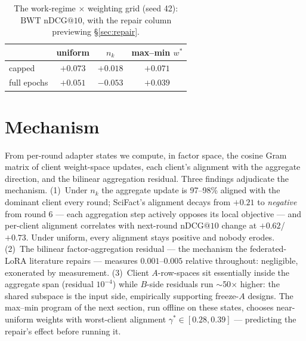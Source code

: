 \documentclass[sigconf,anonymous,review]{acmart}
\makeatletter
\newcommand{\ndcg}{\mathrm{nDCG@10}}
\newcommand{\BWT}{\mathrm{BWT}}
\makeatother
\begin{document}
\begin{table}[t]
\caption{The work-regime $\times$ weighting grid (seed 42): $\BWT$ $\ndcg$, with the repair column previewing \S\ref{sec:repair}.}
\label{tab:grid}
\begin{tabular}{lccc}
\toprule
 & uniform & $n_k$ & max--min $w^\ast$\\
\midrule
capped & $+0.073$ & $+0.018$ & $+0.071$\\
full epochs & $+0.051$ & $\mathbf{-0.053}$ & $+0.039$\\
\bottomrule
\end{tabular}
\end{table}

\section{Mechanism}\label{sec:mechanism}
From per-round adapter states we compute, in factor space, the cosine Gram matrix of client weight-space updates, each client's alignment with the aggregate direction, and the bilinear aggregation residual. Three findings adjudicate the mechanism. (1)~Under $n_k$ the aggregate update is 97--98\% aligned with the dominant client every round; SciFact's alignment decays from $+0.21$ to \emph{negative} from round 6 --- each aggregation step actively opposes its local objective --- and per-client alignment correlates with next-round $\ndcg$ change at $+0.62$/$+0.73$. Under uniform, every alignment stays positive and nobody erodes. (2)~The bilinear factor-aggregation residual --- the mechanism the federated-LoRA literature repairs --- measures $0.001$--$0.005$ relative throughout: negligible, exonerated by measurement. (3)~Client $A$-row-spaces sit essentially inside the aggregate span (residual $10^{-4}$) while $B$-side residuals run $\sim$50$\times$ higher: the shared subspace is the input side, empirically supporting freeze-$A$ designs. The max--min program of the next section, run offline on these states, chooses near-uniform weights with worst-client alignment $\gamma^\ast \in [0.28, 0.39]$ --- predicting the repair's effect before running it.
\end{document}
